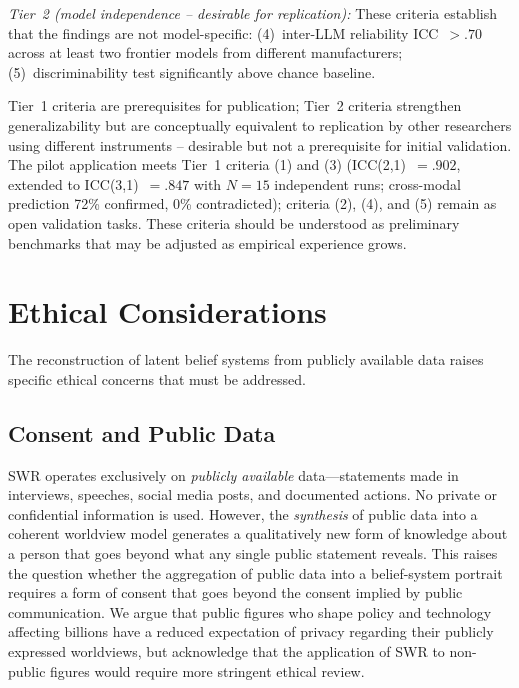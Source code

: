 \documentclass[11pt,a4paper]{article}
\theoremstyle{definition}
\theoremstyle{plain}
\theoremstyle{remark}
\begin{document}
\emph{Tier~2 (model independence -- desirable for replication):} These criteria establish that the findings are not model-specific: (4)~inter-LLM reliability ICC~$> .70$ across at least two frontier models from different manufacturers; (5)~discriminability test significantly above chance baseline.

Tier~1 criteria are prerequisites for publication; Tier~2 criteria strengthen generalizability but are conceptually equivalent to replication by other researchers using different instruments -- desirable but not a prerequisite for initial validation. The pilot application \citep{Geiger2026b} meets Tier~1 criteria (1) and (3) (ICC(2,1)~$= .902$, extended to ICC(3,1)~$= .847$ with $N = 15$ independent runs; cross-modal prediction 72\% confirmed, 0\% contradicted); criteria (2), (4), and (5) remain as open validation tasks. These criteria should be understood as preliminary benchmarks that may be adjusted as empirical experience grows.



\section{Ethical Considerations}
\label{sec:ethics}

The reconstruction of latent belief systems from publicly available data raises specific ethical concerns that must be addressed.

\subsection{Consent and Public Data}

SWR operates exclusively on \emph{publicly available} data---statements made in interviews, speeches, social media posts, and documented actions. No private or confidential information is used. However, the \emph{synthesis} of public data into a coherent worldview model generates a qualitatively new form of knowledge about a person that goes beyond what any single public statement reveals. This raises the question whether the aggregation of public data into a belief-system portrait requires a form of consent that goes beyond the consent implied by public communication. We argue that public figures who shape policy and technology affecting billions have a reduced expectation of privacy regarding their publicly expressed worldviews, but acknowledge that the application of SWR to non-public figures would require more stringent ethical review.
\end{document}
